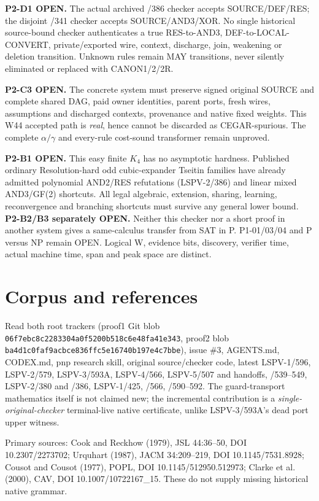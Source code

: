 \documentclass[11pt]{article}
\begin{document}
\noindent\textbf{P2-D1 OPEN.}
The actual archived /386 checker accepts SOURCE/DEF/RES;
the disjoint /341 checker accepts SOURCE/AND3/XOR.
No single historical source-bound checker authenticates
a true RES-to-AND3, DEF-to-LOCAL-CONVERT,
private/exported wire, context, discharge, join,
weakening or deletion transition. Unknown rules
remain MAY transitions, never silently eliminated
or replaced with CANON1/2/2R.

\noindent\textbf{P2-C3 OPEN.}
The concrete system must preserve signed original
SOURCE and complete shared DAG, paid owner identities,
parent ports, fresh wires, assumptions and discharged
contexts, provenance and native fixed weights.
This W44 accepted path is \emph{real}, hence cannot
be discarded as CEGAR-spurious. The complete
$\alpha/\gamma$ and every-rule cost-sound transformer
remain unproved.

\noindent\textbf{P2-B1 OPEN.}
This easy finite $K_4$ has no asymptotic hardness.
Published ordinary Resolution-hard odd cubic-expander
Tseitin families have already admitted polynomial
AND2/RES refutations (LSPV-2/386) and linear mixed
AND3/GF(2) shortcuts. All legal algebraic, extension,
sharing, learning, reconvergence and branching shortcuts
must survive any general lower bound.
\textbf{P2-B2/B3 separately OPEN.}
Neither this checker nor a short proof in another
system gives a same-calculus transfer from SAT in P.
P1-01/03/04 and P versus NP remain OPEN.
Logical W, evidence bits, discovery, verifier time,
actual machine time, span and peak space are distinct.

\section*{Corpus and references}
Read both root trackers (proof1 Git blob
\texttt{06f7ebc8c2283304a0f5200b518c6e48fa41e343},
proof2 blob \texttt{ba4d1c0faf9acbce836ffc5e16740b197e4c7bbe}),
issue \#3, AGENTS.md, CODEX.md, pnp research skill,
original source/checker code, latest LSPV-1/596,
LSPV-2/579, LSPV-3/593A, LSPV-4/566,
LSPV-5/507 and handoffs, /539--549,
LSPV-2/380 and /386, LSPV-1/425, /566, /590--592.
The guard-transport mathematics itself is not claimed
new; the incremental contribution is a
\emph{single-original-checker} terminal-live native
certificate, unlike LSPV-3/593A's dead port upper witness.

Primary sources: Cook and Reckhow (1979),
JSL 44:36--50, DOI 10.2307/2273702;
Urquhart (1987), JACM 34:209--219,
DOI 10.1145/7531.8928;
Cousot and Cousot (1977), POPL,
DOI 10.1145/512950.512973;
Clarke et al. (2000), CAV,
DOI 10.1007/10722167\_15.
These do not supply missing historical native grammar.
\end{document}
